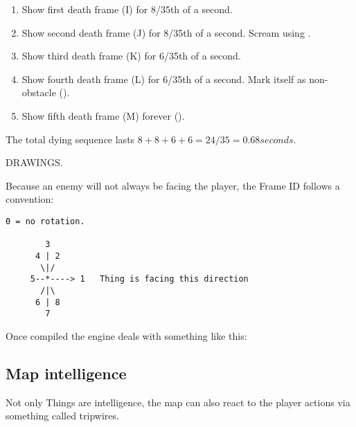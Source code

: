 \begin{enumerate}
\item Show first death frame (I) for 8/35th of a second.
\item Show second death frame (J) for 8/35th of a second. Scream using .
\item Show third death frame (K) for 6/35th of a second.
\item Show fourth death frame (L) for 6/35th of a second. Mark itself as non-obstacle ().
\item Show fifth death frame (M) forever ().
\end{enumerate}
\par
The total dying sequence lasts $8+8+6+6=24/35 = 0.68 seconds$.
\par
DRAWINGS.
\par
Because an enemy will not always be facing the player, the Frame ID follows a convention:
\par
\begin{verbatim}
0 = no rotation.

        3
      4 | 2
       \|/
     5--*----> 1   Thing is facing this direction
       /|\
      6 | 8
        7
\end{verbatim}
\par

Once compiled the engine deals with something like this:\\
\par
{}


\par
{}
\subsection{Map intelligence}
Not only Things are intelligence, the map can also react to the player actions via something called tripwires.
\pngdrawing{tripwire}{}